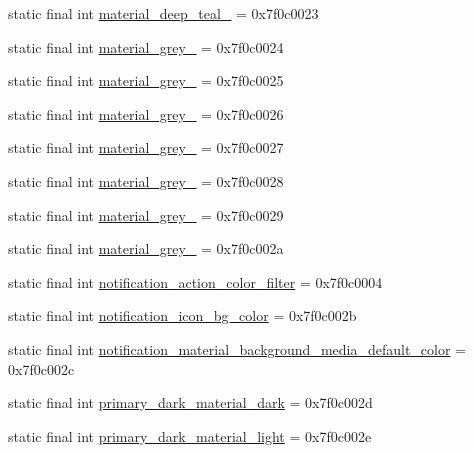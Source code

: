\begin{CompactItemize}
\item 
static final int \hyperlink{classandroid_1_1support_1_1v7_1_1cardview_1_1_r_1_1color_3f9ffde16250987fffe1b65ac6e09dce}{material\_\-deep\_\-teal\_} = 0x7f0c0023
\item 
static final int \hyperlink{classandroid_1_1support_1_1v7_1_1cardview_1_1_r_1_1color_feb64cbd6cf45137b5c184419076ac46}{material\_\-grey\_} = 0x7f0c0024
\item 
static final int \hyperlink{classandroid_1_1support_1_1v7_1_1cardview_1_1_r_1_1color_445086946e246aa2013a021a5d7e3000}{material\_\-grey\_} = 0x7f0c0025
\item 
static final int \hyperlink{classandroid_1_1support_1_1v7_1_1cardview_1_1_r_1_1color_19285be8783074ab38f371ecf8ed73be}{material\_\-grey\_} = 0x7f0c0026
\item 
static final int \hyperlink{classandroid_1_1support_1_1v7_1_1cardview_1_1_r_1_1color_950c34451d99c9c489c2a6ffe1b64fad}{material\_\-grey\_} = 0x7f0c0027
\item 
static final int \hyperlink{classandroid_1_1support_1_1v7_1_1cardview_1_1_r_1_1color_7602a6df2651d77b7dc400a877166aba}{material\_\-grey\_} = 0x7f0c0028
\item 
static final int \hyperlink{classandroid_1_1support_1_1v7_1_1cardview_1_1_r_1_1color_0f31fb5b461c57dabcbd2af15ccd6504}{material\_\-grey\_} = 0x7f0c0029
\item 
static final int \hyperlink{classandroid_1_1support_1_1v7_1_1cardview_1_1_r_1_1color_65e18b5431621c9fbde7702010c41f17}{material\_\-grey\_} = 0x7f0c002a
\item 
static final int \hyperlink{classandroid_1_1support_1_1v7_1_1cardview_1_1_r_1_1color_1a48d5002ef20e535ca13a9526d24c33}{notification\_\-action\_\-color\_\-filter} = 0x7f0c0004
\item 
static final int \hyperlink{classandroid_1_1support_1_1v7_1_1cardview_1_1_r_1_1color_76dc40290cffa583fc7d6ed81a01683f}{notification\_\-icon\_\-bg\_\-color} = 0x7f0c002b
\item 
static final int \hyperlink{classandroid_1_1support_1_1v7_1_1cardview_1_1_r_1_1color_5694084ac07080bc7588ee80f808c8a4}{notification\_\-material\_\-background\_\-media\_\-default\_\-color} = 0x7f0c002c
\item 
static final int \hyperlink{classandroid_1_1support_1_1v7_1_1cardview_1_1_r_1_1color_7f4152f1bd6e409c2671c3730ca936e5}{primary\_\-dark\_\-material\_\-dark} = 0x7f0c002d
\item 
static final int \hyperlink{classandroid_1_1support_1_1v7_1_1cardview_1_1_r_1_1color_850ed7e9ec7e9edf43db85da0ac78492}{primary\_\-dark\_\-material\_\-light} = 0x7f0c002e

\end{CompactItemize}
